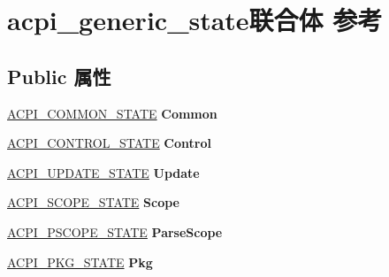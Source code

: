 \hypertarget{unionacpi__generic__state}{}\section{acpi\+\_\+generic\+\_\+state联合体 参考}
\label{unionacpi__generic__state}
\subsection*{Public 属性}
\begin{DoxyCompactItemize}
\item 
\mbox{\label{unionacpi__generic__state_a34283819f1ed18f6a62bfcdc71fd6617}} 
\hyperlink{structacpi__common__state}{A\+C\+P\+I\+\_\+\+C\+O\+M\+M\+O\+N\+\_\+\+S\+T\+A\+TE} {\bfseries Common}
\item 
\mbox{\label{unionacpi__generic__state_ae2fc4aa9ce58c47e8eb3a2f74b9a757a}} 
\hyperlink{structacpi__control__state}{A\+C\+P\+I\+\_\+\+C\+O\+N\+T\+R\+O\+L\+\_\+\+S\+T\+A\+TE} {\bfseries Control}
\item 
\mbox{\label{unionacpi__generic__state_a93daa66f068f216fcb879a072b47e27f}} 
\hyperlink{structacpi__update__state}{A\+C\+P\+I\+\_\+\+U\+P\+D\+A\+T\+E\+\_\+\+S\+T\+A\+TE} {\bfseries Update}
\item 
\mbox{\label{unionacpi__generic__state_a5e71a4672f5f605b3fe195ca202893b4}} 
\hyperlink{structacpi__scope__state}{A\+C\+P\+I\+\_\+\+S\+C\+O\+P\+E\+\_\+\+S\+T\+A\+TE} {\bfseries Scope}
\item 
\mbox{\label{unionacpi__generic__state_ad719d3fff0d3bc02ec4b197728e72d95}} 
\hyperlink{structacpi__pscope__state}{A\+C\+P\+I\+\_\+\+P\+S\+C\+O\+P\+E\+\_\+\+S\+T\+A\+TE} {\bfseries Parse\+Scope}
\item 
\mbox{\label{unionacpi__generic__state_ae0cf9358f257363d72f5c76adb30eeb8}} 
\hyperlink{structacpi__pkg__state}{A\+C\+P\+I\+\_\+\+P\+K\+G\+\_\+\+S\+T\+A\+TE} {\bfseries Pkg}
\item 
\mbox{\label{unionacpi__generic__state_a1255226729177951003b9b2d7ccbb670}} 

\end{DoxyCompactItemize}
